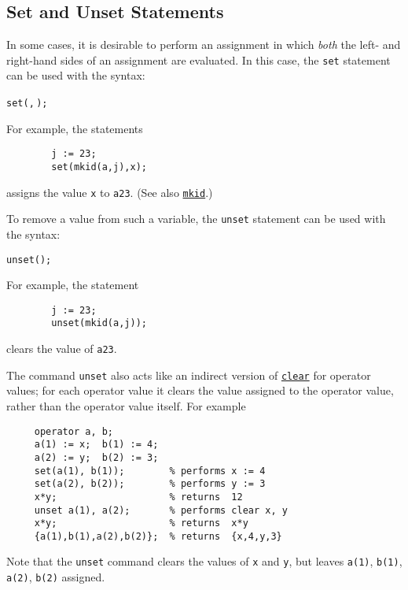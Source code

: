\subsection{Set and Unset Statements}
\hypertarget{command:SET}{}
\hypertarget{command:UNSET}{}

In some cases, it is desirable to perform an assignment in which \emph{both}
the left- and right-hand sides of an assignment are
evaluated.  In this case, the \texttt{set} statement can
be used with the syntax:
\begin{syntax}
  \texttt{set(}\texttt{,}\,\texttt{);}
\end{syntax}
For example, the statements
\begin{verbatim}
        j := 23;
        set(mkid(a,j),x);
\end{verbatim}
assigns the value \texttt{x} to \texttt{a23}.  (See also
\hyperlink{operator:MKID}{\texttt{mkid}}.)

To remove a value from such a variable, the \texttt{unset}
statement can be used with the syntax:
\begin{syntax}
        \texttt{unset(}\texttt{);}
\end{syntax}
For example, the statement
\begin{verbatim}
        j := 23;
        unset(mkid(a,j));
\end{verbatim}
clears the value of \texttt{a23}.

The command \texttt{unset} also acts like an indirect version of
\hyperlink{reserved:CLEAR}{\texttt{clear}} for operator values; for
each operator value it clears the value assigned to the operator
value, rather than the operator value itself.  For example
\begin{verbatim}
     operator a, b;
     a(1) := x;  b(1) := 4;
     a(2) := y;  b(2) := 3;
     set(a(1), b(1));        % performs x := 4
     set(a(2), b(2));        % performs y := 3
     x*y;                    % returns  12
     unset a(1), a(2);       % performs clear x, y
     x*y;                    % returns  x*y
     {a(1),b(1),a(2),b(2)};  % returns  {x,4,y,3}
\end{verbatim}
Note that the \texttt{unset} command clears the values of \texttt{x}
and \texttt{y}, but leaves \texttt{a(1)}, \texttt{b(1)},
\texttt{a(2)}, \texttt{b(2)} assigned.


